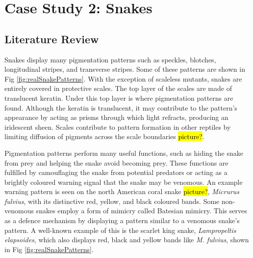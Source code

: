 

\chapter{Case Study 2: Snakes}

\section{Literature Review}
Snakes display many pigmentation patterns such as speckles, blotches, longitudinal stripes, and transverse stripes. Some of these patterns are shown in Fig \ref{fig:realSnakePatterns}. With the exception of scaleless mutants, snakes are entirely covered in protective scales. The top layer of the scales are made of translucent keratin. Under this top layer is where pigmentation patterns are found. Although the keratin is translucent, it may contribute to the pattern's appearance by acting as prisms through which light refracts, producing an iridescent sheen. Scales contribute to pattern formation in other reptiles by limiting diffusion of pigments across the scale boundaries \citep{manukyan2017} \hl{picture?}.

Pigmentation patterns perform many useful functions, such as hiding the snake from prey and helping the snake avoid becoming prey. These functions are fulfilled by camouflaging the snake from potential predators or acting as a brightly coloured warning signal that the snake may be venomous. An example warning pattern is seen on the north American coral snake \hl{picture?}, \textit{Micrurus fulvius}, with its distinctive red, yellow, and black coloured bands. Some non-venomous snakes employ a form of mimicry called Batesian mimicry. This serves as a defence mechanism by displaying a pattern similar to a venomous snake's pattern. A well-known example of this is the scarlet king snake, \textit{Lampropeltis elapsoides}, which also displays red, black and yellow bands like \textit{M. fulvius}, shown in Fig \ref{fig:realSnakePatterns}.

